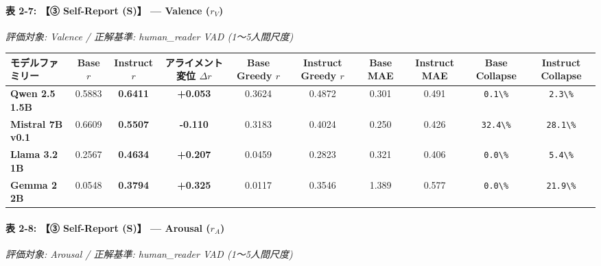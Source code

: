 \paragraph{表 2-7: 【③ Self-Report (S)】 — Valence ($r_V$)}
\textit{評価対象: Valence / 正解基準: human\_reader VAD (1〜5人間尺度)}

\begin{center}
\small
\begin{tabular}{lccccccccc}
\toprule
\textbf{モデルファミリー} & \textbf{Base $r$} & \textbf{Instruct $r$} & \textbf{アライメント変位 $\Delta r$} & \textbf{Base Greedy $r$} & \textbf{Instruct Greedy $r$} & \textbf{Base MAE} & \textbf{Instruct MAE} & \textbf{Base Collapse} & \textbf{Instruct Collapse} \\
\midrule
\textbf{Qwen 2.5 1.5B} & 0.5883 & \textbf{0.6411} & \textbf{+0.053} & 0.3624 & 0.4872 & 0.301 & 0.491 & \texttt{0.1\textbackslash{}\%} & \texttt{2.3\textbackslash{}\%} \\
\textbf{Mistral 7B v0.1} & 0.6609 & \textbf{0.5507} & \textbf{-0.110} & 0.3183 & 0.4024 & 0.250 & 0.426 & \texttt{32.4\textbackslash{}\%} & \texttt{28.1\textbackslash{}\%} \\
\textbf{Llama 3.2 1B} & 0.2567 & \textbf{0.4634} & \textbf{+0.207} & 0.0459 & 0.2823 & 0.321 & 0.406 & \texttt{0.0\textbackslash{}\%} & \texttt{5.4\textbackslash{}\%} \\
\textbf{Gemma 2 2B} & 0.0548 & \textbf{0.3794} & \textbf{+0.325} & 0.0117 & 0.3546 & 1.389 & 0.577 & \texttt{0.0\textbackslash{}\%} & \texttt{21.9\textbackslash{}\%} \\
\bottomrule
\end{tabular}
\end{center}


\paragraph{表 2-8: 【③ Self-Report (S)】 — Arousal ($r_A$)}
\textit{評価対象: Arousal / 正解基準: human\_reader VAD (1〜5人間尺度)}

